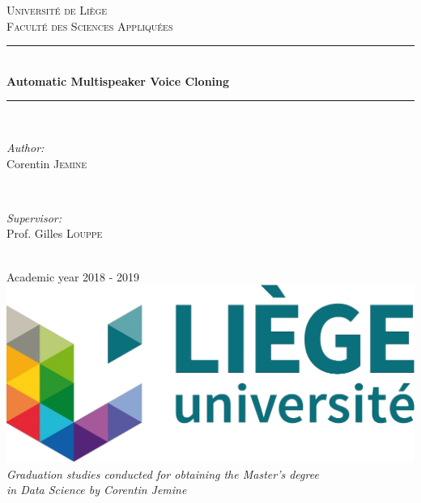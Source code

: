 \documentclass[a4paper, oneside, 12pt, english]{article}
\begin{document}
\begin{titlepage}
	\newcommand{\HRule}{\rule{\linewidth}{0.5mm}}
	\center
	\textsc{\LARGE Université de Liège}\\[1cm]
	\textsc{\Large Faculté des Sciences Appliquées}\\[2cm]
		
	\HRule \\[0.5cm]
	{ \huge \bfseries Automatic Multispeaker Voice Cloning}\\[0.2cm]
	\HRule \\[2cm]

	\begin{minipage}{0.4\textwidth}
		\begin{flushleft} \Large
			\emph{Author:}\\
			Corentin \textsc{Jemine}
		\end{flushleft}
	\end{minipage}
	~
	\begin{minipage}{0.4\textwidth}
		\begin{flushright} \Large
			\emph{Supervisor:} \\
			Prof. Gilles \textsc{Louppe}
		\end{flushright}
	\end{minipage}\\[4cm]
	
	{\LARGE Academic year 2018 - 2019}\\[1cm]
	
	\includegraphics{images/uliege_logo.jpg}\\[1.25cm]
	
	\textit{Graduation studies conducted for obtaining the Master's degree \\in Data Science by Corentin Jemine}
	
	\vfill
\end{titlepage}
\setcounter{page}{2}

\end{document}
